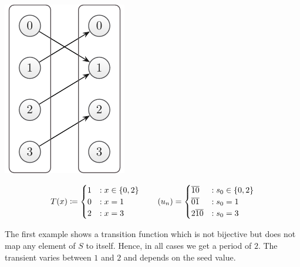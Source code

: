\documentclass{stdlocal}
\begin{document}
    \medskip
    \begin{minipage}{0.2\textwidth}
      \includegraphics[width=\textwidth]{figures/periodicity_example_a.pdf}
    \end{minipage}
    \hfill
    \begin{minipage}{0.73\textwidth}
      \[
        T(x) \define
        \begin{cases}
          1 &: x \in \set{0,2}{} \\
          0 &: x = 1 \\
          2 &: x = 3
        \end{cases}
        \separate
        (u_n) =
        \begin{cases}
          \overline{10} &: s_0 \in \set{0,2}{} \\
          \overline{01} &: s_0 = 1 \\
          2\overline{10} &: s_0 = 3
        \end{cases}
      \]
    \end{minipage}
    \medskip
    \par
    \noindent
    The first example shows a transition function which is not bijective but does not map any element of $S$ to itself.
    Hence, in all cases we get a period of $2$.
    The transient varies between $1$ and $2$ and depends on the seed value.
\end{document}
